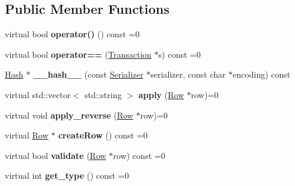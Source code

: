 \subsection*{Public Member Functions}
\begin{DoxyCompactItemize}
\item 
\mbox{\label{classTransaction_af34f894b234bed78705e859e3a310aab}} 
virtual bool {\bfseries operator()} () const =0
\item 
\mbox{\label{classTransaction_a9a17c97fdcda6791484ad6d07b34470e}} 
virtual bool {\bfseries operator==} (\mbox{\hyperlink{classTransaction}{Transaction}} $\ast$s) const =0
\item 
\mbox{\label{classTransaction_a1f0df166c34d6a38a991544cf98c0356}} 
\mbox{\hyperlink{classHash}{Hash}} $\ast$ {\bfseries \+\_\+\+\_\+hash\+\_\+\+\_\+} (const \mbox{\hyperlink{classSerializer}{Serializer}} $\ast$serializer, const char $\ast$encoding) const
\item 
\mbox{\label{classTransaction_a6ea269280c8cc641878f6e5775f270ca}} 
virtual std\+::vector$<$ std\+::string $>$ {\bfseries apply} (\mbox{\hyperlink{classRow}{Row}} $\ast$row)=0
\item 
\mbox{\label{classTransaction_a1ef3b245f37c217f50f8f76fceebca4a}} 
virtual void {\bfseries apply\+\_\+reverse} (\mbox{\hyperlink{classRow}{Row}} $\ast$row)=0
\item 
\mbox{\label{classTransaction_aa80b621537fe480dcb4444bba703abe5}} 
virtual \mbox{\hyperlink{classRow}{Row}} $\ast$ {\bfseries create\+Row} () const =0
\item 
\mbox{\label{classTransaction_a638518143f0defde1c3c73e33db1b7f1}} 
virtual bool {\bfseries validate} (\mbox{\hyperlink{classRow}{Row}} $\ast$row) const =0
\item 
\mbox{\label{classTransaction_a4cf9b81505b83a889bab80229f455589}} 
virtual int {\bfseries get\+\_\+type} () const =0
\item 
\mbox{\label{classTransaction_ad27fb61fcd91863c57ba96a7159b4e8a}} 

\end{DoxyCompactItemize}
